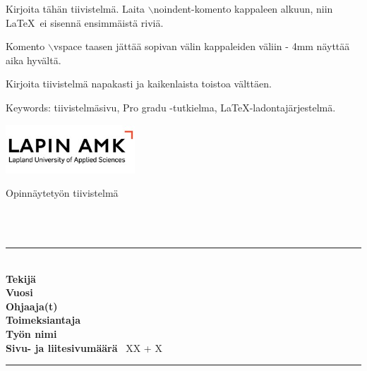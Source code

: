 
\vspace{4mm}\noindent Kirjoita tähän tiivistelmä. Laita $\backslash${noindent}-komento kappaleen
alkuun, niin \LaTeX\, ei sisennä ensimmäistä riviä.

\vspace{4mm}\noindent Komento $\backslash$vspace taasen jättää sopivan välin kappaleiden väliin - 4mm näyttää aika hyvältä.

\vspace{4mm}\noindent Kirjoita tiivistelmä napakasti ja kaikenlaista toistoa välttäen.

\vspace{4mm}\noindent Keywords: tiivistelmäsivu, Pro gradu -tutkielma, \LaTeX-ladontajärjestelmä.



\newpage\null
\pagestyle{empty}  %
\vspace{1.27cm}

\noindent\begin{minipage}{0.4\textwidth}
\noindent\includegraphics[width=4.83cm]{ylatunnisteLogo}
\end{minipage}
\begin{minipage}{0.6\textwidth}\raggedleft
Opinnäytetyön tiivistelmä\\
\end{minipage}\
\noindent\KoulutusFin \\
\tutkintonimikeFin \\
\rule{\textwidth}{.2mm}\\

\vspace{1mm}\noindent \textbf{Tekijä} \	\tekija\\
\vspace{1mm}\noindent \textbf{Vuosi} \	\aika \\
\vspace{1mm}\noindent \textbf{Ohjaaja(t)}	\ \Ohjaajat \\
\vspace{1mm}\noindent \textbf{Toimeksiantaja}	\ \Toimeksiantaja \\
\vspace{1mm}\noindent \textbf{Työn nimi} \	\opinnaytetyo \\
\vspace{1mm}\noindent \textbf{Sivu- ja liitesivumäärä} \	XX + X \\
\noindent\rule{\textwidth}{.2mm}\\


